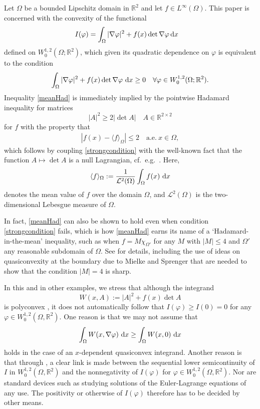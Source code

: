 \documentclass[12pt]{amsart}
\newcommand{\md}{{\rm d}}
\newcommand{\dx}{\, \md x}
\newcommand{\R}{\mathbb{R}}
\newcommand{\om}{\Omega}
\newcommand{\1}{{\bf 1}}
\begin{document}
Let $\Omega$ be a bounded Lipschitz domain in $\R^2$ and let $f\in L^\infty(\Omega)$.  This paper is concerned with the convexity of the functional
\begin{align}\label{eye}I(\varphi)& = \int_{\Omega} |\nabla \varphi|^2+ f(x)\det \nabla \varphi \dx \end{align}
defined on $W_0^{1,2}(\Omega;\R^2)$, which given its quadratic dependence on $\varphi$ is equivalent to the condition 
\begin{align}\label{meanHad}
     \int_{\om} |\nabla \varphi|^2 + f(x)  \det \nabla \varphi \, \dx \geq 0 \quad  \forall \varphi \in W_0^{1,2}(\Omega;\R^2).
    \end{align}
Inequality \eqref{meanHad} is immediately implied by the pointwise Hadamard inequality for matrices $$|A|^2 \geq 2|\det A| \quad A  \in \R^{2 \times 2} $$ 
for $f$ with the property that 
\begin{align}\label{strongcondition} |f(x) - \langle f \rangle_{\om}| \leq 2 \quad \mathrm{a.e.} \ x \in \om,\end{align}
which follows by coupling \eqref{strongcondition} with the well-known fact that the function $A \mapsto \det A$ is a null Lagrangian, cf.~e.g.~\cite{dacorogna}.   Here, 
$$  \langle f \rangle_{\om}:=\frac{1}{\mathcal{L}^2(\om)}\int_{\om} f(x) \, \dx$$
denotes the mean value of $f$ over the domain $\om$, and $\mathcal{L}^2(\om)$ is the two-dimensional Lebesgue measure of $\om$.  


In fact, \eqref{meanHad} can also be shown to hold even when condition \eqref{strongcondition} fails, which is how \eqref{meanHad} earns its name of a `Hadamard-in-the-mean' inequality, such as when $f=M \chi_{\om'}$ for any $M$ with $|M|\leq 4$ and $\om'$ any reasonable subdomain of $\om$.  See \cite[Proposition 3.4]{BKV23} for details, including the use of ideas on quasiconvexity at the boundary due to Mielke and Sprenger \cite{mielke-sprenger} that are needed to show that the condition $|M|=4$ is sharp.  

In this and in other examples, we stress that although the integrand
$$ W(x,A):= |A|^2 + f(x) \det A $$
is polyconvex \cite{Ba77}, it does not automatically follow that $I(\varphi) \geq I(0)=0$ for any $\varphi \in W_0^{1,2}(\om,\R^2)$.  One reason is that we may not assume that 
$$\int_{\om}W(x,\nabla \varphi) \, \dx \geq \int_{\om}W(x,0)\, \dx$$
holds in the case of an $x$-dependent quasiconvex integrand. Another reason is that through \cite[Proposition 6.2]{BKV23}, a clear link is made between the sequential lower semicontinuity of $I$ in $W_0^{1,2}(\om,\R^2)$ and the nonnegativity of $I(\varphi)$ for $\varphi \in W_0^{1,2}(\om,\R^2)$.  Nor are standard devices such as studying solutions of the Euler-Lagrange equations of any use.  The positivity or otherwise of $I(\varphi)$ therefore has to be decided by other means.
\end{document}
